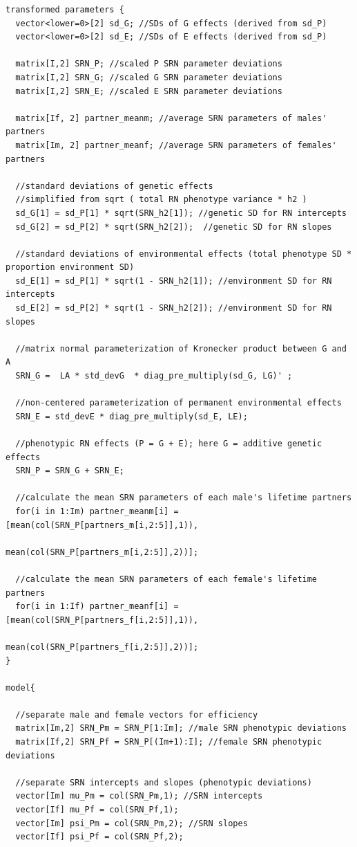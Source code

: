 \documentclass[
]{book}
\begin{document}
\begin{verbatim}
transformed parameters {
  vector<lower=0>[2] sd_G; //SDs of G effects (derived from sd_P)
  vector<lower=0>[2] sd_E; //SDs of E effects (derived from sd_P)
  
  matrix[I,2] SRN_P; //scaled P SRN parameter deviations
  matrix[I,2] SRN_G; //scaled G SRN parameter deviations
  matrix[I,2] SRN_E; //scaled E SRN parameter deviations
  
  matrix[If, 2] partner_meanm; //average SRN parameters of males' partners
  matrix[Im, 2] partner_meanf; //average SRN parameters of females' partners
  
  //standard deviations of genetic effects
  //simplified from sqrt ( total RN phenotype variance * h2 )
  sd_G[1] = sd_P[1] * sqrt(SRN_h2[1]); //genetic SD for RN intercepts 
  sd_G[2] = sd_P[2] * sqrt(SRN_h2[2]);  //genetic SD for RN slopes
  
  //standard deviations of environmental effects (total phenotype SD * proportion environment SD)
  sd_E[1] = sd_P[1] * sqrt(1 - SRN_h2[1]); //environment SD for RN intercepts 
  sd_E[2] = sd_P[2] * sqrt(1 - SRN_h2[2]); //environment SD for RN slopes 
  
  //matrix normal parameterization of Kronecker product between G and A
  SRN_G =  LA * std_devG  * diag_pre_multiply(sd_G, LG)' ; 
  
  //non-centered parameterization of permanent environmental effects
  SRN_E = std_devE * diag_pre_multiply(sd_E, LE);
  
  //phenotypic RN effects (P = G + E); here G = additive genetic effects
  SRN_P = SRN_G + SRN_E;

  //calculate the mean SRN parameters of each male's lifetime partners
  for(i in 1:Im) partner_meanm[i] = [mean(col(SRN_P[partners_m[i,2:5]],1)),
                                mean(col(SRN_P[partners_m[i,2:5]],2))];
  
  //calculate the mean SRN parameters of each female's lifetime partners
  for(i in 1:If) partner_meanf[i] = [mean(col(SRN_P[partners_f[i,2:5]],1)),
                                mean(col(SRN_P[partners_f[i,2:5]],2))];
}

model{
  
  //separate male and female vectors for efficiency
  matrix[Im,2] SRN_Pm = SRN_P[1:Im]; //male SRN phenotypic deviations
  matrix[If,2] SRN_Pf = SRN_P[(Im+1):I]; //female SRN phenotypic deviations
  
  //separate SRN intercepts and slopes (phenotypic deviations)
  vector[Im] mu_Pm = col(SRN_Pm,1); //SRN intercepts
  vector[If] mu_Pf = col(SRN_Pf,1); 
  vector[Im] psi_Pm = col(SRN_Pm,2); //SRN slopes
  vector[If] psi_Pf = col(SRN_Pf,2); 
  

\end{verbatim}
\end{document}
